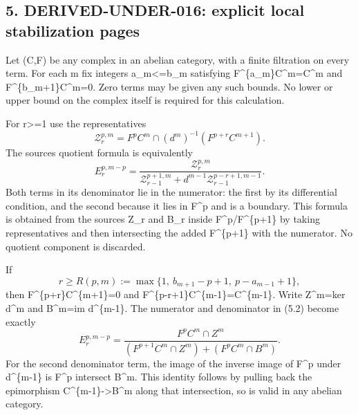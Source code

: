 \documentclass[11pt]{article}
\begin{document}
\subsection{\texorpdfstring{5. DERIVED-UNDER-016:\allowbreak{} explicit local stabilization pages}{5.  explicit local stabilization pages}}\label{proofs-8352-8772-derived-under-016-explicit-local-stabilization-pages}

Let (C,\allowbreak{}F)\allowbreak{} be any complex in an abelian category,\allowbreak{} with a finite filtration on every term. For each m fix integers a\_\allowbreak{}m<\allowbreak{}=b\_\allowbreak{}m satisfying F\textasciicircum{}\{a\_\allowbreak{}m\}C\textasciicircum{}m\allowbreak{}=C\textasciicircum{}m and F\textasciicircum{}\{b\_\allowbreak{}m\allowbreak{}+1\}C\textasciicircum{}m\allowbreak{}=0. Zero terms may be given any such bounds. No lower or upper bound on the complex itself is required for this calculation.

For r>\allowbreak{}=1 use the representatives \[
 \mathcal Z_r^{p,m}
     =F^pC^m\cap(d^m)^{-1}(F^{p+r}C^{m+1}).
                                                               \tag{5.1}
\] The source\textquotesingle s quotient formula is equivalently \[
 E_r^{p,m-p}=
 \frac{\mathcal Z_r^{p,m}}
 {\mathcal Z_{r-1}^{p+1,m}
       +d^{m-1}\mathcal Z_{r-1}^{p-r+1,m-1}}.                 \tag{5.2}
\] Both terms in its denominator lie in the numerator:\allowbreak{} the first by its differential condition,\allowbreak{} and the second because it lies in F\^{}p and is a boundary. This formula is obtained from the source\textquotesingle s Z\_\allowbreak{}r and B\_\allowbreak{}r inside F\textasciicircum{}p/\allowbreak{}F\textasciicircum{}\{p\allowbreak{}+1\} by taking representatives and then intersecting the added F\textasciicircum{}\{p\allowbreak{}+1\} with the numerator. No quotient component is discarded.

If \[
 r\ge R(p,m):=
 \max\{1,\ b_{m+1}-p+1,\ p-a_{m-1}+1\},                    \tag{5.3}
\] then F\textasciicircum{}\{p\allowbreak{}+r\}C\textasciicircum{}\{m\allowbreak{}+1\}\allowbreak{}=0 and F\textasciicircum{}\{p-r\allowbreak{}+1\}C\textasciicircum{}\{m-1\}\allowbreak{}=C\textasciicircum{}\{m-1\}. Write Z\textasciicircum{}m\allowbreak{}=ker d\^{}m and B\textasciicircum{}m\allowbreak{}=im d\^{}\{m-1\}. The numerator and denominator in (5.2)\allowbreak{} become exactly \[
 E_r^{p,m-p}=
 \frac{F^pC^m\cap Z^m}
 {(F^{p+1}C^m\cap Z^m)+(F^pC^m\cap B^m)}.                  \tag{5.4}
\] For the second denominator term,\allowbreak{} the image of the inverse image of F\^{}p under d\^{}\{m-1\} is F\^{}p intersect B\^{}m. This identity follows by pulling back the epimorphism C\textasciicircum{}\{m-1\}\allowbreak{}->B\textasciicircum{}m along that intersection,\allowbreak{} so is valid in any abelian category.
\end{document}
